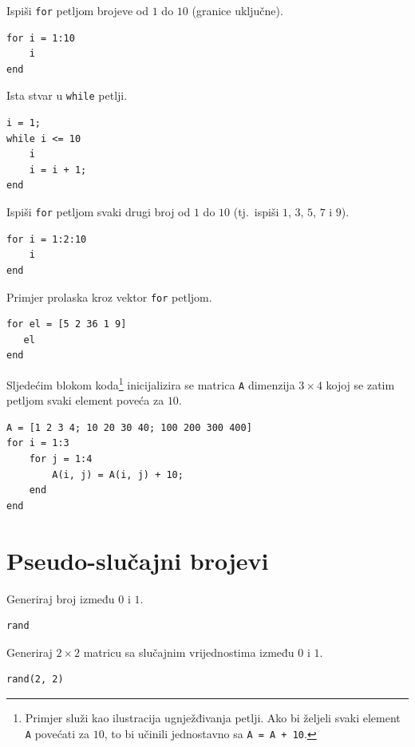 \documentclass[a4paper, 10pt]{article}
\newcommand{\spec}[1]{\texttt{#1}} %
\begin{document}
Ispiši \spec{for} petljom brojeve od $1$ do $10$ (granice uključne).

\begin{lstlisting}
for i = 1:10
    i
end
\end{lstlisting}

Ista stvar u \spec{while} petlji.

\begin{lstlisting}
i = 1;
while i <= 10
    i
    i = i + 1;
end
\end{lstlisting}

Ispiši \spec{for} petljom svaki drugi broj od $1$ do $10$ (tj.\ ispiši $1$, $3$, $5$, $7$ i $9$).

\begin{lstlisting}
for i = 1:2:10
    i
end
\end{lstlisting}

Primjer prolaska kroz vektor \spec{for} petljom.

\begin{lstlisting}
for el = [5 2 36 1 9]
   el
end
\end{lstlisting}

Sljedećim blokom koda\footnote{Primjer služi kao ilustracija ugnježđivanja petlji.
Ako bi željeli svaki element \spec{A} povećati za $10$, to bi učinili jednostavno sa \spec{A = A + 10}.}
inicijalizira se matrica \spec{A} dimenzija $3 \times 4$ kojoj se zatim petljom svaki element poveća za $10$.

\begin{lstlisting}
A = [1 2 3 4; 10 20 30 40; 100 200 300 400]
for i = 1:3
    for j = 1:4
        A(i, j) = A(i, j) + 10;
    end
end
\end{lstlisting}


\section{Pseudo-slučajni brojevi}

Generiraj broj između $0$ i $1$.

\begin{lstlisting}
rand
\end{lstlisting}

Generiraj $2 \times 2$ matricu sa slučajnim vrijednostima između $0$ i $1$.

\begin{lstlisting}
rand(2, 2)
\end{lstlisting}
\end{document}
